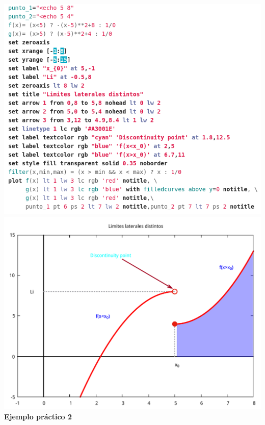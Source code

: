 \documentclass[11.5pt,a4paper]{article}
\begin{document}
\includegraphics[scale=0.43]{screen3.png}  
\includegraphics[scale=0.40]{ejemplo4.pdf}\\ 

\textbf{Ejemplo práctico 2}\\
\end{document}
